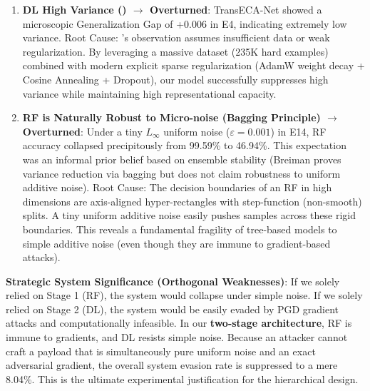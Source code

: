 \documentclass[sigconf]{acmart}
\begin{document}
\begin{enumerate}
\item \textbf{DL High Variance (\cite{5}) $\to$ Overturned}: TransECA-Net showed a microscopic Generalization Gap of +0.006 in E4, indicating extremely low variance. Root Cause: \cite{8}'s observation assumes insufficient data or weak regularization. By leveraging a massive dataset (235K hard examples) combined with modern explicit sparse regularization (AdamW weight decay + Cosine Annealing + Dropout), our model successfully suppresses high variance while maintaining high representational capacity.

\item \textbf{RF is Naturally Robust to Micro-noise (Bagging Principle) $\to$ Overturned}: Under a tiny $L_\infty$ uniform noise ($\varepsilon = 0.001$) in E14, RF accuracy collapsed precipitously from 99.59\% to 46.94\%. This expectation was an informal prior belief based on ensemble stability (Breiman \cite{3} proves variance reduction via bagging but does not claim robustness to uniform additive noise). Root Cause: The decision boundaries of an RF in high dimensions are axis-aligned hyper-rectangles with step-function (non-smooth) splits. A tiny uniform additive noise easily pushes samples across these rigid boundaries. This reveals a fundamental fragility of tree-based models to simple additive noise (even though they are immune to gradient-based attacks).
\end{enumerate}

\textbf{Strategic System Significance (Orthogonal Weaknesses)}: If we solely relied on Stage 1 (RF), the system would collapse under simple noise. If we solely relied on Stage 2 (DL), the system would be easily evaded by PGD gradient attacks and computationally infeasible. In our \textbf{two-stage architecture}, RF is immune to gradients, and DL resists simple noise. Because an attacker cannot craft a payload that is simultaneously pure uniform noise and an exact adversarial gradient, the overall system evasion rate is suppressed to a mere 8.04\%. This is the ultimate experimental justification for the hierarchical design.
\end{document}
